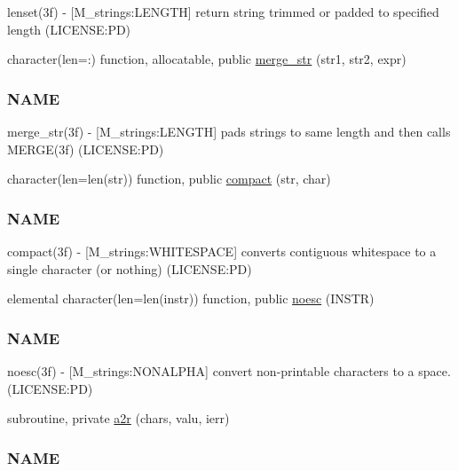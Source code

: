 \begin{DoxyCompactItemize}
\begin{DoxyCompactList}
lenset(3f) -\/ \mbox{[}M\+\_\+strings\+:L\+E\+N\+G\+TH\mbox{]} return string trimmed or padded to specified length (L\+I\+C\+E\+N\+SE\+:PD) \end{DoxyCompactList}\item 
character(len=\+:) function, allocatable, public \mbox{\hyperlink{namespacem__strings_aba5a8d7fc092b38d1939f37a13247c1e}{merge\+\_\+str}} (str1, str2, expr)
\begin{DoxyCompactList}\small\item\em \subsubsection*{N\+A\+ME}

merge\+\_\+str(3f) -\/ \mbox{[}M\+\_\+strings\+:L\+E\+N\+G\+TH\mbox{]} pads strings to same length and then calls M\+E\+R\+G\+E(3f) (L\+I\+C\+E\+N\+SE\+:PD) \end{DoxyCompactList}\item 
character(len=len(str)) function, public \mbox{\hyperlink{namespacem__strings_a929c032267cb990ad4991fab4aed1d57}{compact}} (str, char)
\begin{DoxyCompactList}\small\item\em \subsubsection*{N\+A\+ME}

compact(3f) -\/ \mbox{[}M\+\_\+strings\+:W\+H\+I\+T\+E\+S\+P\+A\+CE\mbox{]} converts contiguous whitespace to a single character (or nothing) (L\+I\+C\+E\+N\+SE\+:PD) \end{DoxyCompactList}\item 
elemental character(len=len(instr)) function, public \mbox{\hyperlink{namespacem__strings_a5d72fde097444c689f1822c5ad95e03d}{noesc}} (I\+N\+S\+TR)
\begin{DoxyCompactList}\small\item\em \subsubsection*{N\+A\+ME}

noesc(3f) -\/ \mbox{[}M\+\_\+strings\+:N\+O\+N\+A\+L\+P\+HA\mbox{]} convert non-\/printable characters to a space. (L\+I\+C\+E\+N\+SE\+:PD) \end{DoxyCompactList}\item 
subroutine, private \mbox{\hyperlink{namespacem__strings_a6b4babf586dc3586426b13e4bb0fb979}{a2r}} (chars, valu, ierr)
\begin{DoxyCompactList}\small\item\em \subsubsection*{N\+A\+ME}


\end{DoxyCompactList}
\end{DoxyCompactItemize}
